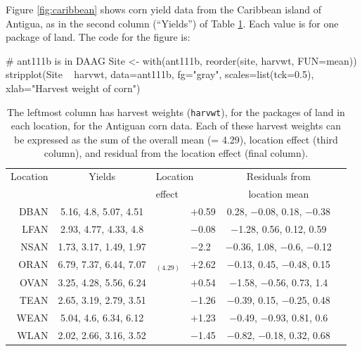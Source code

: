 \documentclass{tufte-book}\usepackage[]{graphicx}\usepackage[]{color}
\newcommand{\txtt}[1]{\texttt{#1}}
\begin{document}
Figure \ref{fig:caribbean} shows corn yield data from the Caribbean island of
Antigua, as in the second column (``Yields'') of Table \ref{tab:ant111b}.
Each value is for one package of land.
The code for the figure is:
\begin{Schunk}
\begin{Sinput}
# ant111b is in DAAG
Site <- with(ant111b, reorder(site, harvwt,
                              FUN=mean))
stripplot(Site ~ harvwt, data=ant111b, fg="gray",
          scales=list(tck=0.5),
          xlab="Harvest weight of corn")
\end{Sinput}
\end{Schunk}

\begin{table}
\begin{center}
{\small
\begin{tabular}{@{}rc||r@{\hspace{1mm}}lcc@{}}
\hline
\multicolumn{1}{c}{Location}  & \multicolumn{1}{c}{Yields}  &
\multicolumn{2}{l}{Location} & Residuals from\\
 & & \multicolumn{2}{l}{effect} & \multicolumn{1}{c}{location mean}\\
\hline
DBAN &  5.16, 4.8, 5.07, 4.51 &  \vline& $+$0.59 & 0.28, $-$0.08, 0.18, $-$0.38 \\
LFAN &  2.93, 4.77, 4.33, 4.8 &  \vline& $-$0.08 &  $-$1.28, 0.56, 0.12, 0.59 \\
NSAN & 1.73, 3.17, 1.49, 1.97 &  \vline& $-$2.2 & $-$0.36, 1.08, $-$0.6, $-$0.12 \\
ORAN & 6.79, 7.37, 6.44, 7.07 & $_{(4.29)} $ \vline& $+$2.62 & $-$0.13, 0.45, $-$0.48, 0.15 \\
OVAN & 3.25, 4.28, 5.56, 6.24 &  \vline& $+$0.54 &  $-$1.58, $-$0.56, 0.73, 1.4 \\
TEAN & 2.65, 3.19, 2.79, 3.51 &  \vline& $-$1.26 & $-$0.39, 0.15, $-$0.25, 0.48 \\
WEAN &  5.04, 4.6, 6.34, 6.12 &  \vline& $+$1.23 &  $-$0.49, $-$0.93, 0.81, 0.6 \\
WLAN & 2.02, 2.66, 3.16, 3.52 &  \vline& $-$1.45 & $-$0.82, $-$0.18, 0.32, 0.68 \\
\hline
\end{tabular}
}
\caption{The leftmost column has harvest weights (\txtt{harvwt}), for
  the packages of land in each location, for the Antiguan corn data.  Each of
  these harvest weights can be expressed as the sum of the overall
  mean (= 4.29), location effect (third column), and residual from the
  location effect (final column).
\label{tab:ant111b}}
\end{center}
\vspace*{-0pt}
\end{table}
\vspace*{3pt}
\end{document}

